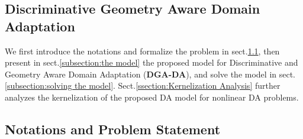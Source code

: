 \documentclass[journal,twocolumn]{IEEEtran}
\newcommand\luo[1]{{\footnotesize \color{blue}[#1 - \textbf{Luo}]}}
\begin{document}
\begin{CJK*}{UTF8}{gkai}





\section{Discriminative   Geometry Aware Domain Adaptation}
We first introduce the notations and formalize the problem in sect.\ref{subsection:Notations and Problem Statement}, then present in sect.\ref{subsection:the model}  the proposed model for Discriminative and Geometry Aware Domain Adaptation (\textbf{DGA-DA}), and solve the model in sect.\ref{subsection:solving the model}. Sect.\ref{ssection:Kernelization Analysis} further analyzes the kernelization of the proposed DA model for nonlinear DA problems.

\subsection{Notations and Problem Statement}
\label{subsection:Notations and Problem Statement}




\end{CJK*}
\end{document}
